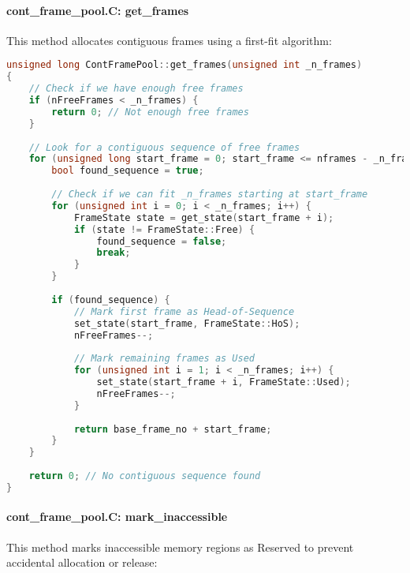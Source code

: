 \documentclass{article}
\begin{document}
\paragraph{cont\_frame\_pool.C: get\_frames} This method allocates contiguous frames using a first-fit algorithm:

\begin{lstlisting}[language=C++, caption=Frame Allocation Method]
unsigned long ContFramePool::get_frames(unsigned int _n_frames)
{
    // Check if we have enough free frames
    if (nFreeFrames < _n_frames) {
        return 0; // Not enough free frames
    }
    
    // Look for a contiguous sequence of free frames
    for (unsigned long start_frame = 0; start_frame <= nframes - _n_frames; start_frame++) {
        bool found_sequence = true;
        
        // Check if we can fit _n_frames starting at start_frame
        for (unsigned int i = 0; i < _n_frames; i++) {
            FrameState state = get_state(start_frame + i);
            if (state != FrameState::Free) {
                found_sequence = false;
                break;
            }
        }
        
        if (found_sequence) {
            // Mark first frame as Head-of-Sequence
            set_state(start_frame, FrameState::HoS);
            nFreeFrames--;
            
            // Mark remaining frames as Used
            for (unsigned int i = 1; i < _n_frames; i++) {
                set_state(start_frame + i, FrameState::Used);
                nFreeFrames--;
            }
            
            return base_frame_no + start_frame;
        }
    }
    
    return 0; // No contiguous sequence found
}
\end{lstlisting}

\paragraph{cont\_frame\_pool.C: mark\_inaccessible} This method marks inaccessible memory regions as Reserved to prevent accidental allocation or release:
\end{document}
